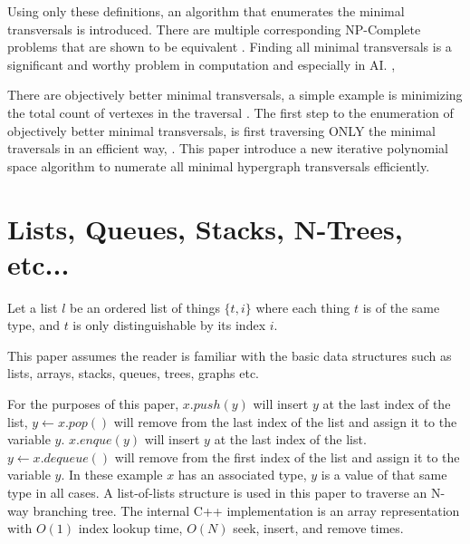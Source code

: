 Using only these definitions, an algorithm that enumerates the minimal transversals is introduced. There are multiple corresponding NP-Complete problems that are shown to be equivalent \cite{eiter1995identifying}. Finding all minimal transversals is a significant and worthy problem in computation and especially in AI. \cite{reiter1987theory}, \cite{de1987diagnosing}

There are objectively better minimal transversals, a simple example is minimizing the total count of vertexes in the traversal \cite{bailey2003fast}. The first step to the enumeration of objectively better minimal transversals, is first traversing ONLY the minimal traversals in an efficient way, \cite{boros2003efficient}. This paper introduce a new iterative polynomial space algorithm to numerate all minimal hypergraph transversals efficiently.

\section{Lists, Queues, Stacks, N-Trees, etc...}
\begin{definition}
	Let a list $l$ be an ordered list of things $\{t,i\}$ where each thing $t$ is of the same type, and $t$ is only distinguishable by its index $i$.
\end{definition}
This paper assumes the reader is familiar with the basic data structures such as lists, arrays, stacks, queues, trees, graphs etc. 

For the purposes of this paper, $x.push(y)$ will insert $y$ at the last index of the list, $y \gets x.pop()$ will remove from the last index of the list and assign it to the variable $y$.  $x.enque(y)$ will insert $y$ at the last index of the list. $y \gets x.dequeue()$ will remove from the first index of the list and assign it to the variable $y$. In these example $x$ has an associated type, $y$ is a value of that same type in all cases. A list-of-lists structure is used in this paper to traverse an N-way branching tree. The internal C++ implementation is an array representation with $O(1)$ index lookup time, $O(N)$ seek, insert, and remove times.